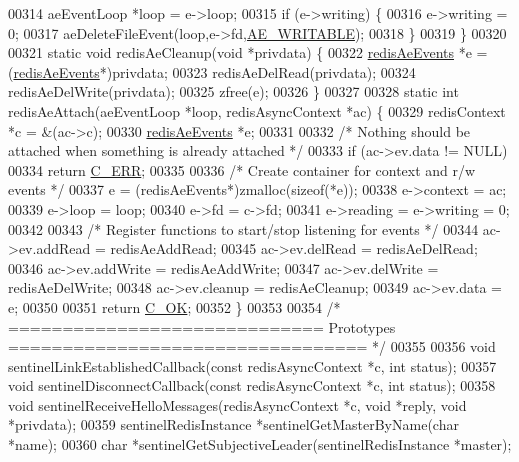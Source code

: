 \begin{DoxyCode}
00314     aeEventLoop *loop = e->loop;
00315     \textcolor{keywordflow}{if} (e->writing) \{
00316         e->writing = 0;
00317         aeDeleteFileEvent(loop,e->fd,\hyperlink{ae_8h_ab6bfb0366ccb6277112d132c2a2bf500}{AE\_WRITABLE});
00318     \}
00319 \}
00320 
00321 \textcolor{keyword}{static} \textcolor{keywordtype}{void} redisAeCleanup(\textcolor{keywordtype}{void} *privdata) \{
00322     \hyperlink{structredisAeEvents}{redisAeEvents} *e = (\hyperlink{structredisAeEvents}{redisAeEvents}*)privdata;
00323     redisAeDelRead(privdata);
00324     redisAeDelWrite(privdata);
00325     zfree(e);
00326 \}
00327 
00328 \textcolor{keyword}{static} \textcolor{keywordtype}{int} redisAeAttach(aeEventLoop *loop, redisAsyncContext *ac) \{
00329     redisContext *c = &(ac->c);
00330     \hyperlink{structredisAeEvents}{redisAeEvents} *e;
00331 
00332     \textcolor{comment}{/* Nothing should be attached when something is already attached */}
00333     \textcolor{keywordflow}{if} (ac->ev.data != NULL)
00334         \textcolor{keywordflow}{return} \hyperlink{server_8h_af98ac28d5f4d23d7ed5985188e6fb7d1}{C\_ERR};
00335 
00336     \textcolor{comment}{/* Create container for context and r/w events */}
00337     e = (redisAeEvents*)zmalloc(\textcolor{keyword}{sizeof}(*e));
00338     e->context = ac;
00339     e->loop = loop;
00340     e->fd = c->fd;
00341     e->reading = e->writing = 0;
00342 
00343     \textcolor{comment}{/* Register functions to start/stop listening for events */}
00344     ac->ev.addRead = redisAeAddRead;
00345     ac->ev.delRead = redisAeDelRead;
00346     ac->ev.addWrite = redisAeAddWrite;
00347     ac->ev.delWrite = redisAeDelWrite;
00348     ac->ev.cleanup = redisAeCleanup;
00349     ac->ev.data = e;
00350 
00351     \textcolor{keywordflow}{return} \hyperlink{server_8h_a303769ef1065076e68731584e758d3e1}{C\_OK};
00352 \}
00353 
00354 \textcolor{comment}{/* ============================= Prototypes ================================= */}
00355 
00356 \textcolor{keywordtype}{void} sentinelLinkEstablishedCallback(\textcolor{keyword}{const} redisAsyncContext *c, \textcolor{keywordtype}{int} status);
00357 \textcolor{keywordtype}{void} sentinelDisconnectCallback(\textcolor{keyword}{const} redisAsyncContext *c, \textcolor{keywordtype}{int} status);
00358 \textcolor{keywordtype}{void} sentinelReceiveHelloMessages(redisAsyncContext *c, \textcolor{keywordtype}{void} *reply, \textcolor{keywordtype}{void} *privdata);
00359 sentinelRedisInstance *sentinelGetMasterByName(\textcolor{keywordtype}{char} *name);
00360 \textcolor{keywordtype}{char} *sentinelGetSubjectiveLeader(sentinelRedisInstance *master);

\end{DoxyCode}
